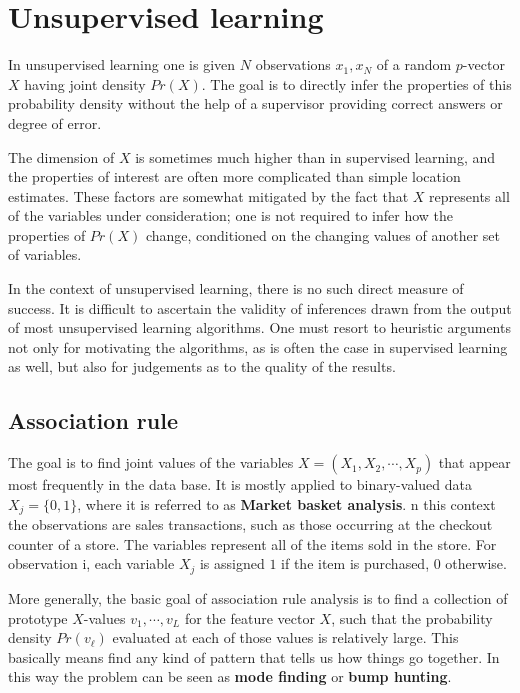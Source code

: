 \section{Unsupervised learning}
In unsupervised learning one is given $N$ observations $x_1, x_N$ of a random $p$-vector $X$ having joint density $Pr(X)$. The goal is to directly infer the properties of this probability density without the help of a supervisor providing correct answers or degree of error. 

The dimension of $X$ is sometimes much higher than in supervised learning, and the properties of interest are often more complicated than simple location estimates. These factors are somewhat mitigated by the fact that $X$ represents all of the variables under consideration; one is not required to infer how the properties of $Pr(X)$ change, conditioned on the changing values of another set of variables.

In the context of unsupervised learning, there is no such direct measure of success. It is difficult to ascertain the validity of inferences drawn from the output of most unsupervised learning algorithms. One must resort to heuristic arguments not only for motivating the algorithms, as is often the case in supervised learning as well, but also for judgements as to the quality of the results. 

\subsection{Association rule}
The goal is to find joint values of the variables $X = (X_1, X_2, \cdots , X_p)$ that appear most frequently in the data base. It is mostly applied to binary-valued data $X_j = \{0,1\}$, where it is referred to as \textbf{Market basket analysis}. n this context the observations are sales transactions, such as those occurring at the checkout counter of a store. The variables represent all of the items sold in the store. For observation i, each variable $X_j$ is assigned $1$ if the item is purchased, $0$ otherwise.

More generally, the basic goal of association rule analysis is to find a collection of prototype $X$-values $v_1,\cdots,v_L$ for the feature vector $X$, such that the probability density $Pr(v_\ell)$ evaluated at each of those values is relatively large. This basically means find any kind of pattern that tells us how things go together. In this way the problem can be seen as \textbf{mode finding} or \textbf{bump hunting}.

